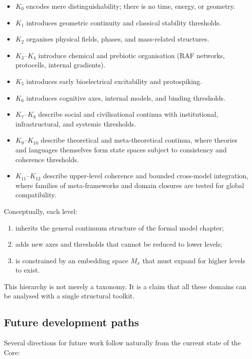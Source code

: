\begin{itemize}
    \item \(K_0\) encodes mere distinguishability; there is no time, energy, or geometry.
    \item \(K_1\) introduces geometric continuity and classical stability thresholds.
    \item \(K_2\) organises physical fields, phases, and mass-related structures.
    \item \(K_3\)--\(K_4\) introduce chemical and prebiotic organisation (RAF networks, protocells, internal gradients).
    \item \(K_5\) introduces early bioelectrical excitability and protospiking.
    \item \(K_6\) introduces cognitive axes, internal models, and binding thresholds.
    \item \(K_7\)--\(K_8\) describe social and civilisational continua with institutional, infrastructural, and systemic thresholds.
    \item \(K_9\)--\(K_{10}\) describe theoretical and meta-theoretical continua,
          where theories and languages themselves form state spaces subject to
          consistency and coherence thresholds.
    \item \(K_{11}\)--\(K_{12}\) describe upper-level coherence and bounded cross-model integration, where families of meta-frameworks and
          domain closures are tested for global compatibility.
\end{itemize}

Conceptually, each level:
\begin{enumerate}
    \item inherits the general continuum structure of the formal model chapter;
    \item adds new axes and thresholds that cannot be reduced to lower levels;
    \item is constrained by an embedding space \(M_x\) that must expand for higher levels to exist.
\end{enumerate}
This hierarchy is not merely a taxonomy.
It is a claim that all these domains can be analysed with a single structural toolkit.

\subsection{Future development paths}

Several directions for future work follow naturally from the current state of the Core:

